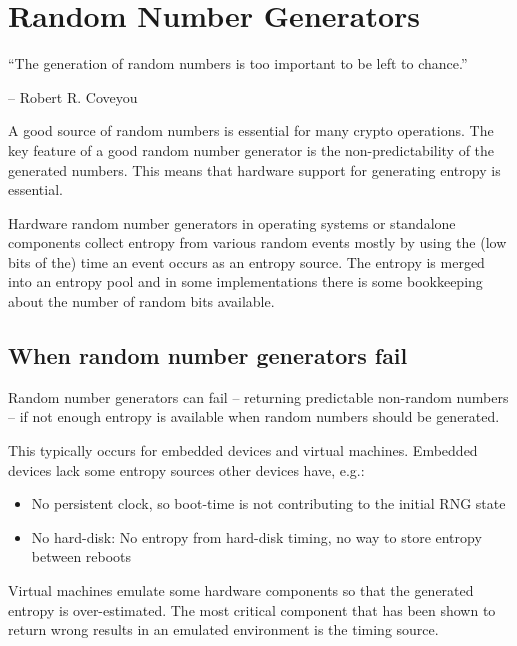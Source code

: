 \section{Random Number Generators}
\label{section:RNGs}


\epigraph{``The generation of random numbers is too important to be left to chance.''}{-- Robert R. Coveyou}

A good source of random numbers is essential for many crypto
operations. The key feature of a good random number generator is the
non-predictability of the generated numbers. This means that hardware
support for generating entropy is essential.


Hardware random number generators in operating systems or standalone
components collect entropy from various random events mostly by using
the (low bits of the) time an event occurs as an entropy source. The
entropy is merged into an entropy pool and in some implementations there
is some bookkeeping about the number of random bits available.

\subsection{When random number generators fail}

Random number generators can fail -- returning predictable non-random
numbers -- if not enough entropy is available when random numbers should
be generated.

This typically occurs for embedded devices and virtual machines.
Embedded devices lack some entropy sources other devices have, e.g.:

\begin{itemize}
\item No persistent clock, so boot-time is not contributing to the
    initial RNG state
\item No hard-disk: No entropy from hard-disk timing, no way to store
    entropy between reboots
\end{itemize}

Virtual machines emulate some hardware components so that the
generated entropy is over-estimated. The most critical component that
has been shown to return wrong results in an emulated environment is the
timing source\cite{Eng11,POL11}.

